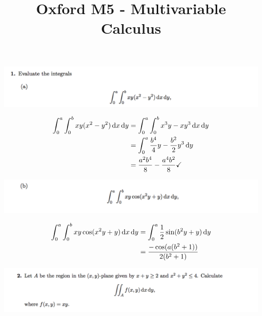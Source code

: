 \documentclass[12pt]{article}
\begin{document}
\title{Oxford M5 - Multivariable Calculus
  }
\author{}
\date{}
\maketitle


\section{}

\begin{mdframed}
\includegraphics[width=400pt]{img/oxford-prelims-M5-multivariable-calc-1-1-a.png}
\end{mdframed}

\begin{align*}
  \int_0^a\int_0^b xy(x^2 - y^2)\dx\dy
  &= \int_0^a\int_0^b x^3y - xy^3\dx\dy\\
  &= \int_0^a\frac{b^4}{4}y - \frac{b^2}{2}y^3\dy\\
  &= \frac{a^2b^4}{8} - \frac{a^4b^2}{8} \checkmark
\end{align*}

\begin{mdframed}
\includegraphics[width=400pt]{img/oxford-prelims-M5-multivariable-calc-1-1-b.png}
\end{mdframed}

\begin{align*}
  \int_0^a\int_0^b xy\cos(x^2y + y)\dx\dy
  &= \int_0^a \frac{1}{2}\sin(b^2y + y) \dy\\
  &= \frac{-\cos(a(b^2 + 1))}{2(b^2 + 1)}
\end{align*}

\begin{mdframed}
\includegraphics[width=400pt]{img/oxford-prelims-M5-multivariable-calc-1-2.png}
\end{mdframed}
\end{document}
